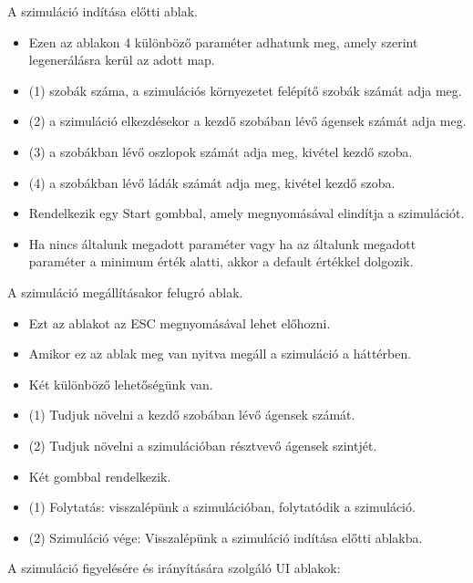 
A szimuláció indítása előtti ablak.

\begin{itemize}
    \item Ezen az ablakon 4 különböző paraméter adhatunk meg, amely szerint legenerálásra kerül az adott map.
    \item (1) szobák száma, a szimulációs környezetet felépítő szobák számát adja meg.
    \item (2) a szimuláció elkezdésekor a kezdő szobában lévő ágensek számát adja meg.
    \item (3) a szobákban lévő oszlopok számát adja meg, kivétel kezdő szoba.
    \item (4) a szobákban lévő ládák számát adja meg, kivétel kezdő szoba.
    \item Rendelkezik egy Start gombbal, amely megnyomásával elindítja a szimulációt.
    \item Ha nincs általunk megadott paraméter vagy ha az általunk megadott paraméter a minimum érték alatti, akkor a default értékkel dolgozik.
\end{itemize}

A szimuláció megállításakor felugró ablak.

\begin{itemize}
    \item Ezt az ablakot az ESC megnyomásával lehet előhozni.
    \item Amikor ez az ablak meg van nyitva megáll a szimuláció a háttérben.
    \item Két különböző lehetőségünk van.
    \item (1) Tudjuk növelni a kezdő szobában lévő ágensek számát.
    \item (2) Tudjuk növelni a szimulációban résztvevő ágensek szintjét.
    \item Két gombbal rendelkezik.
    \item (1) Folytatás: visszalépünk a szimulációban, folytatódik a szimuláció.
    \item (2) Szimuláció vége: Visszalépünk a szimuláció indítása előtti ablakba.
\end{itemize}


\label{UI}

A szimuláció figyelésére és irányítására szolgáló UI ablakok:

